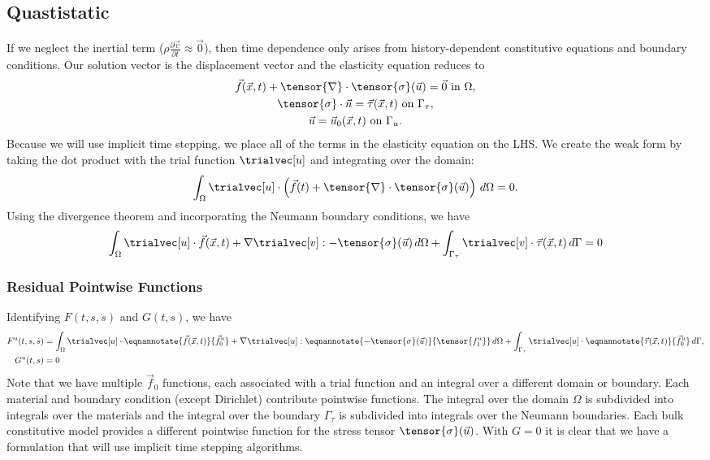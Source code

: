 \subsection{Quastistatic}

If we neglect the inertial term
($\rho \frac{\partial \vec{v}}{\partial t} \approx \vec{0}$), then
time dependence only arises from history-dependent constitutive
equations and boundary conditions. Our solution vector is the
displacement vector and the elasticity equation reduces to
\begin{gather}
  \label{eqn:elasticity:strong:form:quasistatic}
  \vec{f}(\vec{x},t) + \tensor{\nabla} \cdot \tensor{\sigma}(\vec{u}) = \vec{0} \text{ in }\Omega, \\
%
  \tensor{\sigma} \cdot \vec{n} = \vec{\tau}(\vec{x},t) \text{ on }\Gamma_\tau, \\
%
  \vec{u} = \vec{u}_0(\vec{x},t) \text{ on }\Gamma_u.
\end{gather}
Because we will use implicit time stepping, we place all of the terms
in the elasticity equation on the LHS. We create the weak form by
taking the dot product with the trial function $\trialvec[u]$ and
integrating over the domain:
\begin{equation}
    \int_\Omega \trialvec[u] \cdot \left( \vec{f}(t) + \tensor{\nabla}
      \cdot \tensor{\sigma} (\vec{u}) \right) \, d\Omega = 0. 
\end{equation}
Using the divergence theorem and incorporating the Neumann boundary conditions, we have
\begin{equation}
% 
  \int_\Omega \trialvec[u] \cdot \vec{f}(\vec{x},t) + \nabla \trialvec[v] : -\tensor{\sigma}(\vec{u}) \, d\Omega
  + \int_{\Gamma_\tau} \trialvec[v] \cdot \vec{\tau}(\vec{x},t) \, d\Gamma = 0
\end{equation}

\subsubsection{Residual Pointwise Functions}

Identifying $F(t,s,\dot{s})$ and $G(t,s)$, we have
\begin{align}
  F^u(t,s,\dot{s}) &=  \int_\Omega \trialvec[u] \cdot \eqnannotate{\vec{f}(\vec{x},t)}{\vec{f}^u_0} + \nabla \trialvec[u] : \eqnannotate{-\tensor{\sigma}(\vec{u})}{\tensor{f^u_1}} \, d\Omega
  + \int_{\Gamma_\tau} \trialvec[u] \cdot \eqnannotate{\vec{\tau}(\vec{x},t)}{\vec{f}^u_0} \, d\Gamma, \\
  G^u(t,s) &= 0
\end{align}
Note that we have multiple $\vec{f}_0$ functions, each associated with
a trial function and an integral over a different domain or
boundary. Each material and boundary condition (except Dirichlet)
contribute pointwise functions. The integral over the domain $\Omega$
is subdivided into integrals over the materials and the integral over
the boundary $\Gamma_\tau$ is subdivided into integrals over the
Neumann boundaries. Each bulk constitutive model provides a different
pointwise function for the stress tensor
$\tensor{\sigma}(\vec{u})$. With $G=0$ it is clear that we have a
formulation that will use implicit time stepping algorithms.

